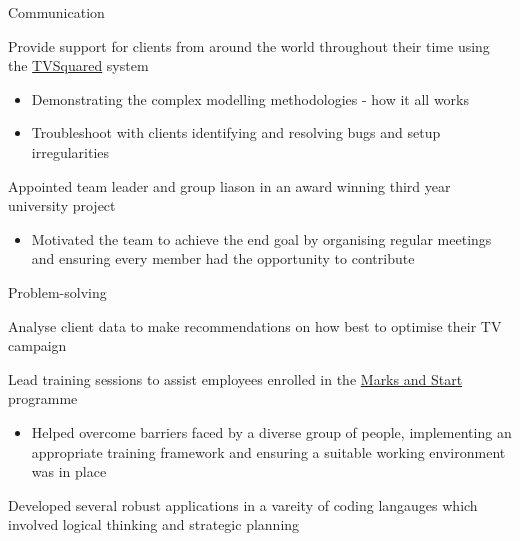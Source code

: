\begin{cventries}
\cventry
    {Communication}
    {}
    {}
    {}
    {
      \begin{cvitems}
      \item {Provide support for clients from around the world throughout their time using the \href{http://tvsquared.com/}{TVSquared} system}
       \vspace{1mm}
       	\begin{itemize}
       		 \item Demonstrating the complex modelling methodologies - how it all works
       		 \vspace{.5mm}
             \item Troubleshoot with clients identifying and resolving bugs and setup irregularities
      	 \end{itemize}
       \item {Appointed team leader and group liason in an award winning third year university project}
       \vspace{1mm}
       	\begin{itemize}
      	 \item Motivated the team to achieve the end goal by organising regular meetings and ensuring every member
       		 had the opportunity to contribute
      	 \end{itemize}
        \end{cvitems}
      }
     \cventry
    {Problem-solving}
    {}
    {}
    {}
    {
      \begin{cvitems}
      \item {Analyse client data to make recommendations on how best to optimise their TV campaign}
      \item {Lead training sessions to assist employees enrolled in the  \href{http://careers.marksandspencer.com/helping-you-find-work}{Marks and Start} programme}
      \vspace{1mm}
       	\begin{itemize}
       	\item Helped overcome barriers faced by a diverse group of people, implementing an appropriate training framework and ensuring a suitable working environment was in place
       \end{itemize}
      \item {Developed several robust applications in a vareity of coding langauges which involved logical thinking and strategic planning}
      \vspace{1mm}

\end{cvitems}}
\end{cventries}
